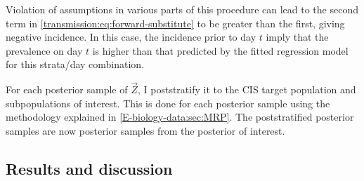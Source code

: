 \documentclass[thesis.tex]{subfiles}
\begin{document}

Violation of assumptions in various parts of this procedure can lead to the second term in \cref{transmission:eq:forward-substitute} to be greater than the first, giving negative incidence.
In this case, the incidence prior to day $t$ imply that the prevalence on day $t$ is higher than that predicted by the fitted regression model for this strata/day combination.

For each posterior sample of $\vec{Z}$, I poststratify it to the CIS target population and subpopulations of interest.
This is done for each posterior sample using the methodology explained in \cref{E-biology-data:sec:MRP}.
The poststratified posterior samples are now posterior samples from the posterior of interest.


\subsection{Results and discussion} \label{backcalc:sec:results}
\end{document}
